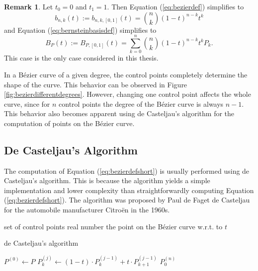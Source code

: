\documentclass[a4paper, 11pt]{report}
\theoremstyle{definition}
\newtheorem*{remark}{Remark}
\newcommand{\Desc}[2]{\State \makebox[12em][l]{#1}#2}
\begin{document}
	\begin{remark}
		Let $t_0 = 0$ and $t_1 = 1$. Then Equation (\ref{eq:bezierdef}) simplifies to
		\begin{equation*}
			b_{n,k}(t) := b_{n,k,[0,1]}(t) = \binom{n}{k} (1-t)^{n-k}t^k
		\end{equation*}
		and Equation (\ref{eq:bernsteinbasisdef}) simplifies to
		\begin{equation}\label{eq:bezierdefshort}
			B_P(t) := B_{P,[0,1]}(t)= \sum_{k=0}^n \binom{n}{k} (1-t)^{n-k}t^k P_k.
		\end{equation}
		This case is the only case considered in this thesis.
	\end{remark}

	In a Bézier curve of a given degree, the control points completely determine the shape of the curve. This behavior can be observed in Figure \ref{fig:bezierdifferentdegrees}. However, changing one control point affects the whole curve, since for $n$ control points the degree of the Bézier curve is always $n-1$. This behavior also becomes apparent using de Casteljau's algorithm for the computation of points on the Bézier curve.

\subsection{De Casteljau's Algorithm}
	The computation of Equation (\ref{eq:bezierdefshort}) is usually performed using de Casteljau's algorithm. This is because the algorithm yields a simple implementation and lower complexity than straightforwardly computing Equation (\ref{eq:bezierdefshort}). The algorithm was proposed by Paul de Faget de Casteljau for the automobile manufacturer Citroën in the 1960s.

	\begin{algorithm}[H]
		\begin{algorithmic}[1]
			\Input
				\Desc{$P = \{P_0, P_1, ..., P_n\}$}{set of control points}
				\Desc{$t$}{real number}
			\EndInput
			\Output
				\Desc{$P^{(n)}_0 = B_P(t)$}{the point on the Bézier curve w.r.t. to $t$}
			\EndOutput

			\caption{de Casteljau's algorithm}\label{alg:decasteljaualgo}
				\State $P^{(0)} \gets P$
						\State $P^{(j)}_k \gets (1-t) \cdot P^{(j-1)}_k + t \cdot P^{(j-1)}_{k+1}$
					\EndFor
				\EndFor
				\State \Return $P^{(n)}_0$
			\EndProcedure
		\end{algorithmic}
	\end{algorithm}
\end{document}
